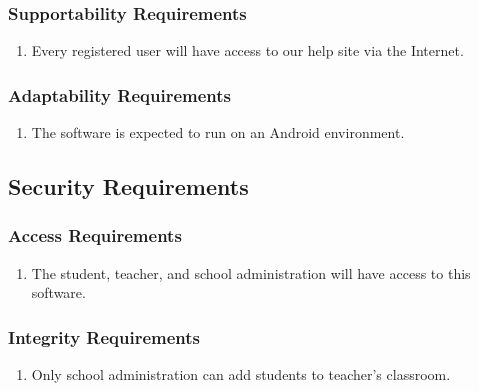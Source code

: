 \documentclass[]{article}
\begin{document}
\subsubsection{Supportability Requirements}
\label{ssub:supportability_requirements}
\begin{enumerate}[{MS}1. ]
	\item Every registered user will have access to our help site via the Internet.  
\end{enumerate}

\subsubsection{Adaptability Requirements}
\label{ssub:adaptability_requirements}
\begin{enumerate}[{MS}1. ]
	\item  The software is expected to run on an Android environment.
\end{enumerate}


\subsection{Security Requirements}
\label{sub:security_requirements}

\subsubsection{Access Requirements}
\label{ssub:access_requirements}
\begin{enumerate}[{SR}1. ]
	\item The student, teacher, and school administration will have access to this software.
\end{enumerate}

\subsubsection{Integrity Requirements}
\label{ssub:integrity_requirements}
\begin{enumerate}[{SR}1. ]
	\item Only school administration can add students
	to teacher's classroom.
\end{enumerate}
\end{document}
